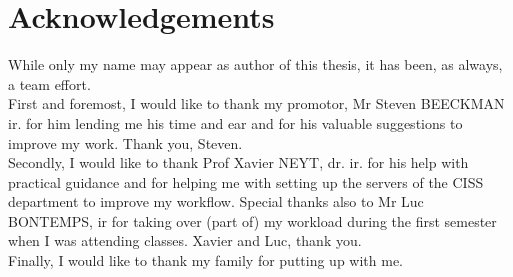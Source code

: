 \chapter*{Acknowledgements}
While only my name may appear as author of this thesis, it has been, as always, a team effort.\\
First and foremost, I would like to thank my promotor, Mr Steven BEECKMAN ir. for him lending me his time and ear and for his valuable suggestions to improve my work. Thank you, Steven.\\
Secondly, I would like to thank Prof  Xavier NEYT, dr. ir. for his help with practical guidance and for helping me with setting up the servers of the CISS department to improve my workflow. Special thanks also to Mr Luc BONTEMPS, ir for taking over (part of) my workload during the first semester when I was attending classes. Xavier and Luc, thank you.\\
Finally, I would like to thank my family for putting up with me.

